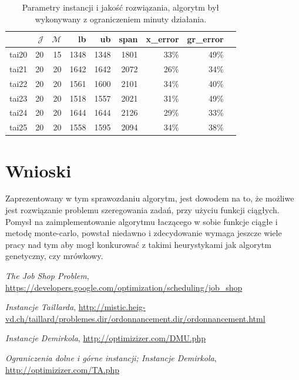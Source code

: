 \documentclass[11pt,twocolumn]{article}
\begin{document}
\begin{table}[b]
\centering
\begin{tabular}{l|rrrrrrrr}
    & $\mathcal{J}$ & $\mathcal{M}$ & lb  & ub   & span & x\_error & gr\_error  \\ \hline
    tai20 & 20  & 15 & 1348 & 1348 & 1801 & 33\% & 49\%\\
    tai21 & 20  & 20 & 1642 & 1642 & 2072 & 26\% & 34\%\\
    tai22 & 20  & 20 & 1561 & 1600 & 2101 & 34\% & 40\%\\
    tai23 & 20  & 20 & 1518 & 1557 & 2021 & 31\% & 49\%\\
    tai24 & 20  & 20 & 1644 & 1644 & 2126 & 29\% & 33\%\\
    tai25 & 20  & 20 & 1558 & 1595 & 2094 & 34\% & 38\%\\
\end{tabular}
\caption{Parametry instancji i jakość rozwiązania, algorytm był wykonywany z ograniczeniem minuty działania.}
\label{tab1}
\end{table}


\section{Wnioski}

Zaprezentowany w tym sprawozdaniu algorytm, jest dowodem na to, że możliwe jest rozwiązanie problemu szeregowania zadań, przy użyciu funkcji ciągłych.
Pomysł na zaimplementowanie algorytmu łaczącego w sobie funkcje ciągłe i metodę monte-carlo, powstał niedawno i zdecydowanie wymaga jeszcze wiele pracy nad tym aby mogł konkurować z takimi heurystykami jak algorytm genetyczny, czy mrówkowy.


\newpage

\begin{thebibliography}{9}

    \textit{The Job Shop Problem},
    \url{https://developers.google.com/optimization/scheduling/job_shop}

    \textit{Instancje Taillarda},
    \url{http://mistic.heig-vd.ch/taillard/problemes.dir/ordonnancement.dir/ordonnancement.html}

    \textit{Instancje Demirkola},
    \url{http://optimizizer.com/DMU.php}

    \textit{Ograniczenia dolne i górne instancji; Instancje Demirkola},
    \url{http://optimizizer.com/TA.php}

\end{thebibliography}
\end{document}
